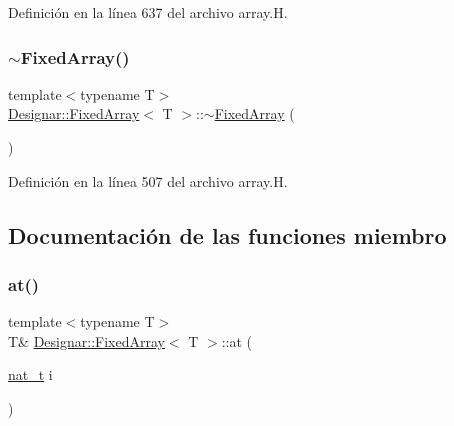 Definición en la línea 637 del archivo array.\+H.

\mbox{\label{class_designar_1_1_fixed_array_adfe330be4cd4afd6a097cf5abd2cec38}} 
\subsubsection{\texorpdfstring{$\sim$\+Fixed\+Array()}{~FixedArray()}}
{\footnotesize\ttfamily template$<$typename T$>$ \\
\hyperlink{class_designar_1_1_fixed_array}{Designar\+::\+Fixed\+Array}$<$ T $>$\+::$\sim$\hyperlink{class_designar_1_1_fixed_array}{Fixed\+Array} (\begin{DoxyParamCaption}{ }\end{DoxyParamCaption})\hspace{0.3cm}{\ttfamily [inline]}}



Definición en la línea 507 del archivo array.\+H.



\subsection{Documentación de las funciones miembro}
\mbox{\label{class_designar_1_1_fixed_array_ae47f2f299aaef27f2decc88f2fd863a9}} 
\subsubsection{\texorpdfstring{at()}{at()}\hspace{0.1cm}{\footnotesize\ttfamily [1/2]}}
{\footnotesize\ttfamily template$<$typename T$>$ \\
T\& \hyperlink{class_designar_1_1_fixed_array}{Designar\+::\+Fixed\+Array}$<$ T $>$\+::at (\begin{DoxyParamCaption}\item[{\hyperlink{namespace_designar_aa72662848b9f4815e7bf31a7cf3e33d1}{nat\+\_\+t}}]{i }\end{DoxyParamCaption})\hspace{0.3cm}{\ttfamily [inline]}}



